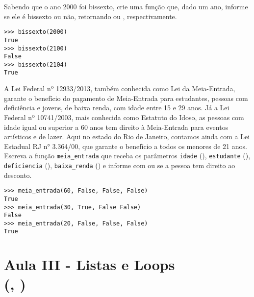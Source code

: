 \documentclass[12pt]{article}
\begin{document}
	\quest Sabendo que o ano 2000 foi bissexto, crie uma função que, dado um ano, informe se ele é bissexto ou não, retornando  ou , respectivamente.\\
	
	\example
	\begin{lstlisting}
>>> bissexto(2000)
True
>>> bissexto(2100)
False
>>> bissexto(2104)
True
	\end{lstlisting}
	
	\pagebreak
	
	
	A Lei Federal nº 12933/2013, também conhecida como Lei da Meia-Entrada, garante o benefício do pagamento de Meia-Entrada para estudantes, pessoas com deficiência e jovens, de baixa renda, com idade entre 15 e 29 anos. Já a Lei Federal nº 10741/2003, mais conhecida como Estatuto do Idoso, as pessoas com idade igual ou superior a 60 anos tem direito à Meia-Entrada para eventos artísticos e de lazer. Aqui no estado do Rio de Janeiro, contamos ainda com a Lei Estadual RJ n° 3.364/00, que garante o benefício a todos os menores de 21 anos.\\
	
	\quest Escreva a função \texttt{meia\_entrada} que receba os parâmetros \texttt{idade} (), \texttt{estudante} (), \texttt{deficiencia} (), \texttt{baixa\_renda} () e informe com  ou  se a pessoa tem direito ao desconto.\\
	
	\example
	\begin{lstlisting}
>>> meia_entrada(60, False, False, False)
True
>>> meia_entrada(30, True, False False)
False
>>> meia_entrada(20, False, False, False)
True
	\end{lstlisting}
	
	\pagebreak
	
	\section{Aula III - Listas e Loops \\(, )}
	
	
\end{document}
